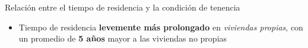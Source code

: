 \documentclass[aspectratio=169]{beamer}
\begin{document}
    \begin{frame}{Relación entre el tiempo de residencia y la condición de tenencia}
        \begin{minipage}{.60\linewidth}
            \begin{overlayarea}{\linewidth}{.85\textheight}
            \end{overlayarea}
        \end{minipage}
        \begin{minipage}{.39\linewidth}
            \small
            \setlength{\leftmargini}{8pt}
            \begin{itemize}
                \item<2-> Tiempo de residencia \textbf{levemente más prolongado} en \textit{viviendas propias}, con un promedio de \textbf{5 años} mayor a las viviendas no propias 


\end{itemize}
\end{minipage}
\end{frame}
\end{document}
